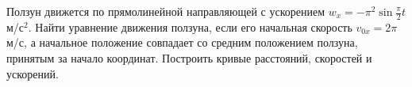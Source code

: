 Ползун движется по прямолинейной направляющей с ускорением
$w_x=-\pi^2 \sin \frac{\pi}{2} t$ м/с$^2$. Найти уравнение движения
ползуна, если его начальная скорость $v_{0x}=2\pi$ м/с, а начальное
положение совпадает со средним положением ползуна, принятым за начало
координат. Построить кривые расстояний, скоростей и ускорений.
